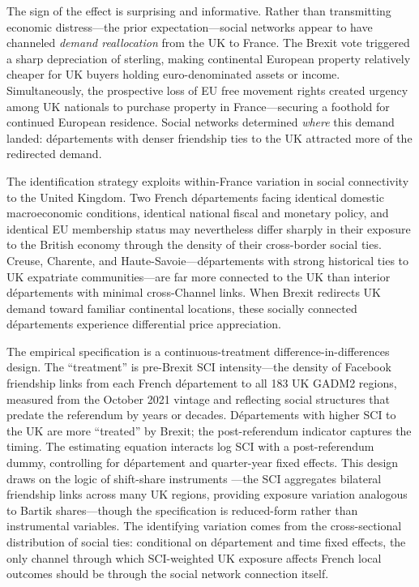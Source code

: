 \documentclass[12pt]{article}
\begin{document}
The sign of the effect is surprising and informative. Rather than transmitting economic distress---the prior expectation---social networks appear to have channeled \textit{demand reallocation} from the UK to France. The Brexit vote triggered a sharp depreciation of sterling, making continental European property relatively cheaper for UK buyers holding euro-denominated assets or income. Simultaneously, the prospective loss of EU free movement rights created urgency among UK nationals to purchase property in France---securing a foothold for continued European residence. Social networks determined \textit{where} this demand landed: d\'epartements with denser friendship ties to the UK attracted more of the redirected demand.

The identification strategy exploits within-France variation in social connectivity to the United Kingdom. Two French d\'epartements facing identical domestic macroeconomic conditions, identical national fiscal and monetary policy, and identical EU membership status may nevertheless differ sharply in their exposure to the British economy through the density of their cross-border social ties. Creuse, Charente, and Haute-Savoie---d\'epartements with strong historical ties to UK expatriate communities---are far more connected to the UK than interior d\'epartements with minimal cross-Channel links. When Brexit redirects UK demand toward familiar continental locations, these socially connected d\'epartements experience differential price appreciation.

The empirical specification is a continuous-treatment difference-in-differences design. The ``treatment'' is pre-Brexit SCI intensity---the density of Facebook friendship links from each French d\'epartement to all 183 UK GADM2 regions, measured from the October 2021 vintage and reflecting social structures that predate the referendum by years or decades. D\'epartements with higher SCI to the UK are more ``treated'' by Brexit; the post-referendum indicator captures the timing. The estimating equation interacts log SCI with a post-referendum dummy, controlling for d\'epartement and quarter-year fixed effects. This design draws on the logic of shift-share instruments \citep{borusyak2022quasi, goldsmith2020bartik}---the SCI aggregates bilateral friendship links across many UK regions, providing exposure variation analogous to Bartik shares---though the specification is reduced-form rather than instrumental variables. The identifying variation comes from the cross-sectional distribution of social ties: conditional on d\'epartement and time fixed effects, the only channel through which SCI-weighted UK exposure affects French local outcomes should be through the social network connection itself.
\end{document}
